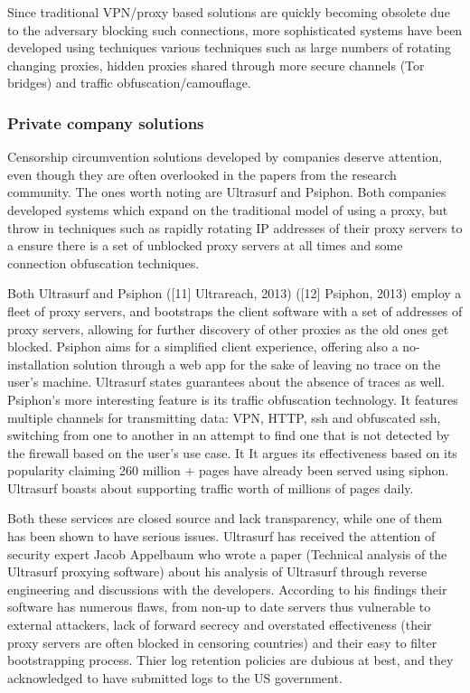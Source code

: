 \documentclass[11pt]{article} %
\begin{document}
Since traditional VPN/proxy based solutions are quickly becoming obsolete due to the adversary blocking such connections, more sophisticated systems have been developed using techniques various techniques such as large numbers of rotating changing proxies, hidden proxies shared through more secure channels (Tor bridges) and traffic obfuscation/camouflage.

\subsubsection{Private company solutions}
Censorship circumvention solutions developed by companies deserve attention, even though they are often overlooked in the papers from the research community. The ones worth noting are Ultrasurf and Psiphon. Both companies developed systems which expand on the traditional model of using a proxy, but throw in techniques such as rapidly rotating IP addresses of their proxy servers to a ensure there is a set of unblocked proxy servers at all times and some connection obfuscation techniques.

Both Ultrasurf and Psiphon ([11] Ultrareach, 2013) ([12] Psiphon, 2013) employ a fleet of proxy servers, and bootstraps the client software with a set of addresses of proxy servers, allowing for further discovery of other proxies as the old ones get blocked. Psiphon aims for a simplified client experience, offering also a no-installation solution through a web app for the sake of leaving no trace on the user’s machine. Ultrasurf states guarantees about the absence of traces as well. Psiphon’s  more interesting feature is its traffic obfuscation technology. It features multiple channels for transmitting data: VPN, HTTP, ssh and obfuscated ssh, switching from one to another in an attempt to find one that is not detected by the firewall based on the user’s use case.  It It argues its effectiveness based on its popularity claiming 260 million + pages have already been served using siphon. Ultrasurf boasts about supporting traffic worth of millions of pages daily.

Both these services are closed source and lack transparency, while one of them has been shown to have serious issues. Ultrasurf has received the attention of security expert Jacob Appelbaum who wrote a paper (Technical analysis of the Ultrasurf proxying software) about his analysis of Ultrasurf through reverse engineering and discussions with the developers. According to his findings their software has numerous flaws, from non-up to date servers thus vulnerable to external attackers, lack of forward secrecy and overstated effectiveness (their proxy servers are often blocked in censoring countries) and their easy to filter bootstrapping process. Thier log retention policies are dubious at best, and they acknowledged to have submitted logs to the US government. 
\end{document}
